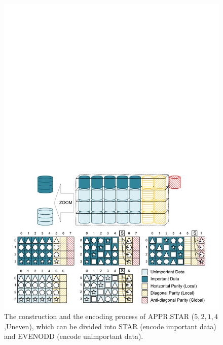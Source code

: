 \documentclass[sigconf]{acmart}
\begin{document}
\begin{figure}[ht]
\centering
\includegraphics[width=\linewidth]{photo/AP-5214-v2.pdf}
\caption{The construction and the encoding process of APPR.STAR ($5,2,1,4$,Uneven), which can be divided into STAR (encode important data) and EVENODD (encode unimportant data).}
\label{fig-ap-5214}
\end{figure}

\end{document}
